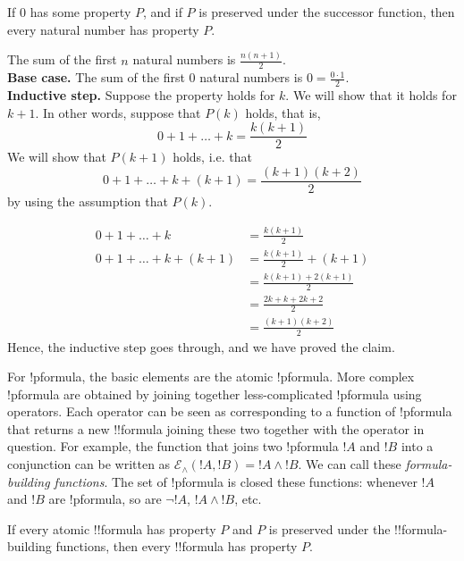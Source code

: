 \documentclass[../../include/open-logic-section]{subfiles}
\begin{document}
\begin{defn}
If 0 has some property $P$, and if $P$ is preserved under the
successor function, then every natural number has property $P$.
\end{defn}

\begin{ex} The sum of the first $n$ natural numbers is $\frac{n(n+1)}{2}$. \\

\textbf{Base case.} The sum of the first 0 natural numbers is $0=
\frac{0\cdot 1}{2}$.\\

\textbf{Inductive step.} Suppose the property holds for $k$. We will
show that it holds for $k+1$. In other words, suppose that $P(k)$
holds, that is,
\[ 0 + 1 + \ldots + k = \frac{k(k+1)}{2} \]
We will show that $P(k+1)$ holds, i.e. that
\[ 0 + 1 + \ldots + k + (k+1) = \frac{(k+1)(k+2)}{2} \]
by using the assumption that $P(k)$.

\begin{align*}
0 + 1 + \ldots + k &= \frac{k(k+1)}{2} \tag{Assumption} \\
0 + 1 + \ldots + k + (k+1) &= \frac{k(k+1)}{2} + (k+1) 
\tag{Add $k+1$ to both sides} \\
&= \frac{k(k+1) + 2(k+1)}{2} \\
&= \frac{2k + k + 2k +2}{2} \\
&=\frac{(k+1)(k+2)}{2}
\end{align*}
Hence, the inductive step goes through, and we have proved the claim.
\end{ex}

\begin{explain}
For !p{formula}, the basic elements are the atomic !p{formula}. More
complex !p{formula} are obtained by joining together less-complicated
!p{formula} using operators. Each operator can be seen as
corresponding to a function of !p{formula} that returns a new
!!{formula} joining these two together with the operator in
question. For example, the function that joins two !p{formula} $!A$
and $!B$ into a conjunction can be written as $\mathcal E _\land (!A,
!B) = !A \land !B$. We can call these \emph{formula-building
  functions}. The set of !p{formula} is closed these functions:
whenever $!A$ and $!B$ are !p{formula}, so are $\lnot !A$, $!A \land
!B$, etc.
\end{explain}

\begin{defn}
If every atomic !!{formula} has property $P$ and $P$ is preserved
under the !!{formula}-building functions, then every !!{formula} has
property $P$.
\end{defn}
\end{document}
